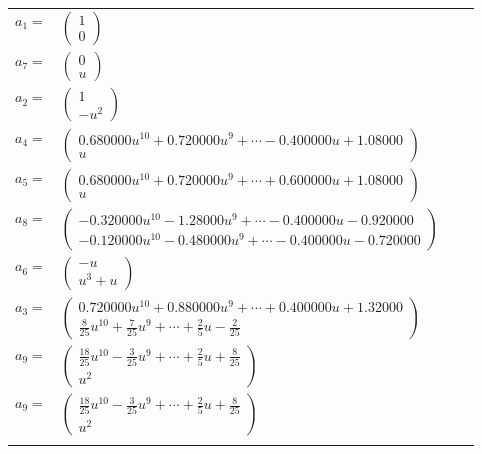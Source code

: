 \documentclass[1p]{elsarticle_modified}
\theoremstyle{definition}
\begin{document}
\begin{tabular}{m{7pt} m{180pt} m{7pt} m{180pt} }
\flushright $a_{1}=$&$\begin{pmatrix}1\\0\end{pmatrix}$ \\
\flushright $a_{7}=$&$\begin{pmatrix}0\\u\end{pmatrix}$ \\
\flushright $a_{2}=$&$\begin{pmatrix}1\\- u^2\end{pmatrix}$ \\
\flushright $a_{4}=$&$\begin{pmatrix}0.680000 u^{10}+0.720000 u^{9}+\cdots-0.400000 u+1.08000\\u\end{pmatrix}$ \\
\flushright $a_{5}=$&$\begin{pmatrix}0.680000 u^{10}+0.720000 u^{9}+\cdots+0.600000 u+1.08000\\u\end{pmatrix}$ \\
\flushright $a_{8}=$&$\begin{pmatrix}-0.320000 u^{10}-1.28000 u^{9}+\cdots-0.400000 u-0.920000\\-0.120000 u^{10}-0.480000 u^{9}+\cdots-0.400000 u-0.720000\end{pmatrix}$ \\
\flushright $a_{6}=$&$\begin{pmatrix}- u\\u^3+u\end{pmatrix}$ \\
\flushright $a_{3}=$&$\begin{pmatrix}0.720000 u^{10}+0.880000 u^{9}+\cdots+0.400000 u+1.32000\\\frac{8}{25} u^{10}+\frac{7}{25} u^9+\cdots+\frac{2}{5} u-\frac{2}{25}\end{pmatrix}$ \\
\flushright $a_{9}=$&$\begin{pmatrix}\frac{18}{25} u^{10}-\frac{3}{25} u^9+\cdots+\frac{2}{5} u+\frac{8}{25}\\u^2\end{pmatrix}$\\ \flushright $a_{9}=$&$\begin{pmatrix}\frac{18}{25} u^{10}-\frac{3}{25} u^9+\cdots+\frac{2}{5} u+\frac{8}{25}\\u^2\end{pmatrix}$\\&\end{tabular}
\end{document}
